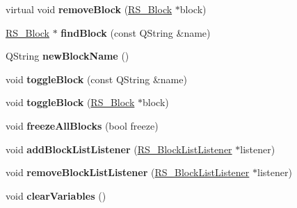 \begin{DoxyCompactItemize}
\item 
\hypertarget{classRS__Graphic_a23f458d966e5ce1b33121039986c6375}{virtual void {\bfseries remove\-Block} (\hyperlink{classRS__Block}{R\-S\-\_\-\-Block} $\ast$block)}\label{classRS__Graphic_a23f458d966e5ce1b33121039986c6375}

\item 
\hypertarget{classRS__Graphic_a843a8edfa76a50f373dc1465a61d81fa}{\hyperlink{classRS__Block}{R\-S\-\_\-\-Block} $\ast$ {\bfseries find\-Block} (const Q\-String \&name)}\label{classRS__Graphic_a843a8edfa76a50f373dc1465a61d81fa}

\item 
\hypertarget{classRS__Graphic_aa65169429f284cf51e0d449afa7aba7f}{Q\-String {\bfseries new\-Block\-Name} ()}\label{classRS__Graphic_aa65169429f284cf51e0d449afa7aba7f}

\item 
\hypertarget{classRS__Graphic_afea47296ec366ca10a6f05ff38504986}{void {\bfseries toggle\-Block} (const Q\-String \&name)}\label{classRS__Graphic_afea47296ec366ca10a6f05ff38504986}

\item 
\hypertarget{classRS__Graphic_af1d45be7c5125fe789f4d20c367d405b}{void {\bfseries toggle\-Block} (\hyperlink{classRS__Block}{R\-S\-\_\-\-Block} $\ast$block)}\label{classRS__Graphic_af1d45be7c5125fe789f4d20c367d405b}

\item 
\hypertarget{classRS__Graphic_aecd265a99ab7b0988fc6602078b7ac79}{void {\bfseries freeze\-All\-Blocks} (bool freeze)}\label{classRS__Graphic_aecd265a99ab7b0988fc6602078b7ac79}

\item 
\hypertarget{classRS__Graphic_a54b199da81b48ba41ab9cb506de302ea}{void {\bfseries add\-Block\-List\-Listener} (\hyperlink{classRS__BlockListListener}{R\-S\-\_\-\-Block\-List\-Listener} $\ast$listener)}\label{classRS__Graphic_a54b199da81b48ba41ab9cb506de302ea}

\item 
\hypertarget{classRS__Graphic_a5ff2748072fc0f049a86c191fd602cc6}{void {\bfseries remove\-Block\-List\-Listener} (\hyperlink{classRS__BlockListListener}{R\-S\-\_\-\-Block\-List\-Listener} $\ast$listener)}\label{classRS__Graphic_a5ff2748072fc0f049a86c191fd602cc6}

\item 
\hypertarget{classRS__Graphic_a4867767f912bf87f91672de69f2f8339}{void {\bfseries clear\-Variables} ()}\label{classRS__Graphic_a4867767f912bf87f91672de69f2f8339}


\end{DoxyCompactItemize}
